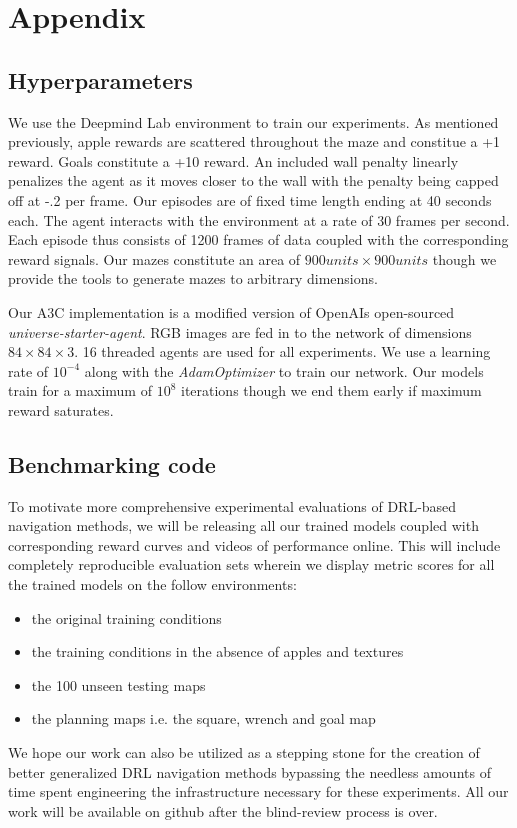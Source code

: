 \section*{Appendix}

\subsection*{Hyperparameters}
We use the Deepmind Lab environment to train our experiments. 
As mentioned previously, apple rewards are scattered throughout the maze and constitue a +1 reward. 
Goals constitute a +10 reward. An included wall penalty linearly penalizes the agent as it moves closer to the wall with the penalty being capped off at -.2 per frame.
Our episodes are of fixed time length ending at 40 seconds each.
The agent interacts with the environment at a rate of 30 frames per second. 
Each episode thus consists of 1200 frames of data coupled with the corresponding reward signals.
Our mazes constitute an area of $900 units \times 900 units$ though we provide the tools to generate mazes to arbitrary dimensions. 

Our A3C implementation is a modified version of OpenAIs open-sourced \emph{universe-starter-agent}. RGB images are fed in to the network of dimensions $84\times84\times3$. 16 threaded agents are used for all experiments. We use a learning rate of $10^{-4}$ along with the \emph{AdamOptimizer} to train our network. Our models train for a maximum of $10^{8}$ iterations though we end them early if maximum reward saturates. 

\subsection*{Benchmarking code}
To motivate more comprehensive experimental evaluations of DRL-based navigation methods, we will be releasing all our trained models coupled with corresponding reward curves and videos of performance online. 
This will include completely reproducible evaluation sets wherein we display metric scores for all the trained models on the follow environments:
\begin{itemize}
    \item the original training conditions
    \item the training conditions in the absence of apples and textures
    \item the 100 unseen testing maps
    \item the planning maps i.e. the square, wrench and goal map
\end{itemize}
We hope our work can also be utilized as a stepping stone for the creation of better generalized DRL navigation methods bypassing the needless amounts of time spent engineering the infrastructure necessary for these experiments. 
All our work will be available on github after the blind-review process is over.


